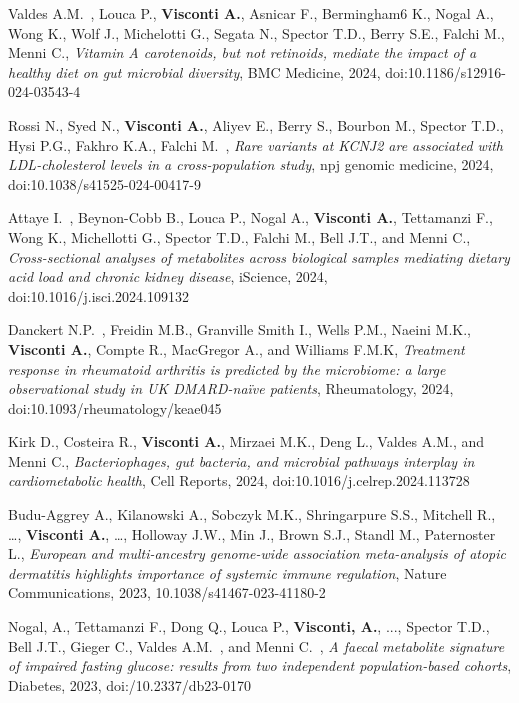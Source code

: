 \begin{itemize}
		 Valdes A.M.\cofirst ~\corresponding, Louca P.\cofirst, \textbf{Visconti A.}, Asnicar F., Bermingham6 K., Nogal A., Wong K., Wolf J., Michelotti G., Segata N., Spector T.D., Berry S.E.,  Falchi M., Menni C.\corresponding, \emph{Vitamin A carotenoids, but not retinoids, mediate the impact of a healthy diet on gut microbial diversity}, BMC Medicine, 2024, doi:10.1186/s12916-024-03543-4 %
	
		 Rossi N., Syed N., \textbf{Visconti A.}, Aliyev E., Berry S., Bourbon M., Spector T.D., Hysi P.G.\colast, Fakhro K.A.\colast, Falchi M.\colast ~\corresponding, \emph{Rare variants at KCNJ2 are associated with LDL-cholesterol levels in a cross-population study}, npj genomic medicine, 2024, doi:10.1038/s41525-024-00417-9  %
		
		 Attaye I.\cofirst ~\corresponding, Beynon-Cobb B.\cofirst, Louca P., Nogal A., \textbf{Visconti A.}, Tettamanzi F., Wong K., Michellotti G., Spector T.D.,  Falchi M., Bell J.T., and Menni C.\corresponding, \emph{Cross-sectional analyses of metabolites across biological samples mediating dietary acid load and chronic kidney disease}, iScience, 2024, doi:10.1016/j.isci.2024.109132 %
		
		 Danckert N.P.\cofirst ~\corresponding, Freidin M.B.\cofirst, Granville Smith I., Wells P.M., Naeini M.K., \textbf{Visconti A.}, Compte R., MacGregor A., and Williams F.M.K, \emph{Treatment response in rheumatoid arthritis is predicted by the microbiome: a large observational study in UK DMARD-naïve patients}, Rheumatology, 2024, doi:10.1093/rheumatology/keae045 %
		
		 Kirk D., Costeira R., \textbf{Visconti A.}, Mirzaei M.K., Deng L., Valdes A.M., and Menni C.\corresponding, \emph{Bacteriophages, gut bacteria, and microbial pathways interplay in cardiometabolic health}, Cell Reports, 2024, doi:10.1016/j.celrep.2024.113728	%

		  Budu-Aggrey A., Kilanowski A., Sobczyk M.K., Shringarpure S.S., Mitchell R., \dots,  \textbf{Visconti A.}, \dots, Holloway J.W., Min J., Brown S.J., Standl M., Paternoster L.\corresponding, \emph{European and multi-ancestry genome-wide association meta-analysis of atopic dermatitis highlights importance of systemic immune regulation}, Nature Communications, 2023, 10.1038/s41467-023-41180-2 %
		
		 Nogal, A.\cofirst, Tettamanzi F.\cofirst, Dong Q., Louca P., \textbf{Visconti, A.}, ...,  Spector T.D., Bell J.T., Gieger C., Valdes A.M.\colast ~\corresponding, and Menni C.\colast ~\corresponding, \emph{A faecal metabolite signature of impaired fasting glucose: results from two independent population-based cohorts}, Diabetes, 2023, doi:/10.2337/db23-0170 %
		

\end{itemize}

